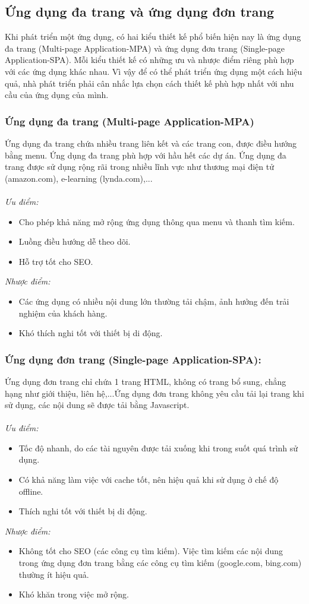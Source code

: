 \subsection{Ứng dụng đa trang và ứng dụng đơn trang}
Khi phát triển một ứng dụng, có hai kiểu thiết kế phổ biến hiện nay là ứng dụng đa trang (Multi-page Application-MPA) và ứng dụng đơn trang (Single-page Application-SPA). Mỗi kiểu thiết kế có những ưu và nhược điểm riêng phù hợp với các ứng dụng khác nhau. Vì vậy để có thể phát triển ứng dụng một cách hiệu quả, nhà phát triển phải cân nhắc lựa chọn cách thiết kế phù hợp nhất với nhu cầu của ứng dụng của mình.
\subsubsection{Ứng dụng đa trang (Multi-page Application-MPA)}
Ứng dụng đa trang chứa nhiều trang liên kết và các trang con, được điều hướng bằng menu. Ứng dụng đa trang phù hợp với hầu hết các dự án. Ứng dụng đa trang được sử dụng rộng rãi trong nhiều lĩnh vực như thương mại điện tử (amazon.com), e-learning (lynda.com),...\\\\\textit{Ưu điểm:}
\begin{itemize}
    \item Cho phép khả năng mở rộng ứng dụng thông qua menu và thanh tìm kiếm.
    \item Luồng điều hướng dễ theo dõi. 
    \item Hỗ trợ tốt cho SEO.
\end {itemize}
\textit{Nhược điểm:}
\begin{itemize}
    \item Các ứng dụng có nhiều nội dung lớn thường tải chậm, ảnh hưởng đến trải nghiệm của khách hàng.
    \item Khó thích nghi tốt với thiết bị di động.
\end {itemize}
\subsubsection{Ứng dụng đơn trang (Single-page Application-SPA):}
Ứng dụng đơn trang chỉ chứa 1 trang HTML, không có trang bổ sung, chẳng hạng như giới thiệu, liên hệ,...Ứng dụng đơn trang không yêu cầu tải lại trang khi sử dụng, các nội dung sẽ được tải bằng Javascript.\\\\
\textit{Ưu điểm:}
\begin{itemize}
    \item Tốc độ nhanh, do các tài nguyên được tải xuống khi trong suốt quá trình sử dụng.
    \item Có khả năng làm việc với cache tốt, nên hiệu quả khi sử dụng ở chế độ offline.
    \item Thích nghi tốt với thiết bị di động.
\end{itemize}
\textit{Nhược điểm:}
\begin {itemize}
    \item Không tốt cho SEO (các công cụ tìm kiếm). Việc tìm kiếm các nội dung trong ứng dụng đơn trang bằng các công cụ tìm kiếm (google.com, bing.com) thường ít hiệu quả.
    \item Khó khăn trong việc mở rộng.
\end {itemize}
